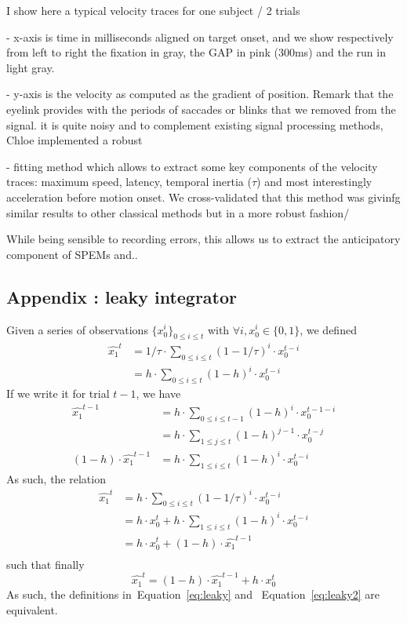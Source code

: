 \documentclass[12pt,english]{article}%
\newcommand{\eq}[1]{\begin{equation*}#1\end{equation*}}
\newcommand{\eqs}[1]{\begin{align*}#1\end{align*}}
\newcommand{\seeEq}[1]{Equation~\ref{eq:#1}}
\begin{document}
I show here a typical velocity traces for one subject / 2 trials

- x-axis is time in milliseconds aligned on target onset,
and we show respectively from left to right the fixation in gray,
the GAP in pink (300ms) and the run in light gray.

- y-axis is the velocity as computed as the gradient of position.
Remark that the eyelink provides with the periods of saccades or
 blinks that we removed from the signal. it is quite noisy and
 to complement existing signal processing methods,
 Chloe implemented a robust

- fitting method which allows to extract some key components of
the velocity traces: maximum speed, latency, temporal inertia ($\tau$)
 and most interestingly acceleration before motion onset.
 We cross-validated that this method was givinfg similar results
  to other classical methods but in a more robust fashion/

While being sensible to recording errors, this allows us to extract the
 anticipatory component of SPEMs and..

\subsection{Appendix : leaky integrator}
\label{app:leaky}
Given a series of observations $\{x_0^i\}_{0\leq i \leq t}$
with $\forall i, x_0^i \in \{0, 1 \}$, we defined
\eqs{
\hat{x_1}^{t} &= 1/\tau \cdot \sum_{0\leq i \leq t} (1 - 1/\tau)^{i} \cdot x_0^{t-i}\\
			  &= h \cdot \sum_{0\leq i \leq t} (1 - h)^{i} \cdot x_0^{t-i}
}
If we write it for trial $t-1$, we have
\eqs{
\hat{x_1}^{t-1}	&= h \cdot \sum_{0\leq i \leq t-1} (1 - h)^{i} \cdot x_0^{t-1-i} \\
                &= h \cdot \sum_{1\leq j \leq t} (1 - h)^{j-1} \cdot x_0^{t-j} \\ %
(1 - h) \cdot \hat{x_1}^{t-1} &= h \cdot \sum_{1\leq i \leq t} (1 - h)^{i} \cdot x_0^{t-i}
                }
As such, the relation
\eqs{
\hat{x_1}^{t}	&= h \cdot \sum_{0\leq i \leq t} (1 - 1/\tau)^{i} \cdot x_0^{t-i} \\
				&= h \cdot x_0^{t} + h \cdot \sum_{1\leq i \leq t} (1 - h)^{i} \cdot x_0^{t-i} \\
				&= h \cdot x_0^{t} + (1 - h) \cdot \hat{x_1}^{t-1} \\
}
such that finally
\eq{
\hat{x_1}^{t} = (1 - h) \cdot \hat{x_1}^{t-1} + h \cdot x_0^t
}
As such, the definitions in~\seeEq{leaky} and ~\seeEq{leaky2} are equivalent.
\end{document}

